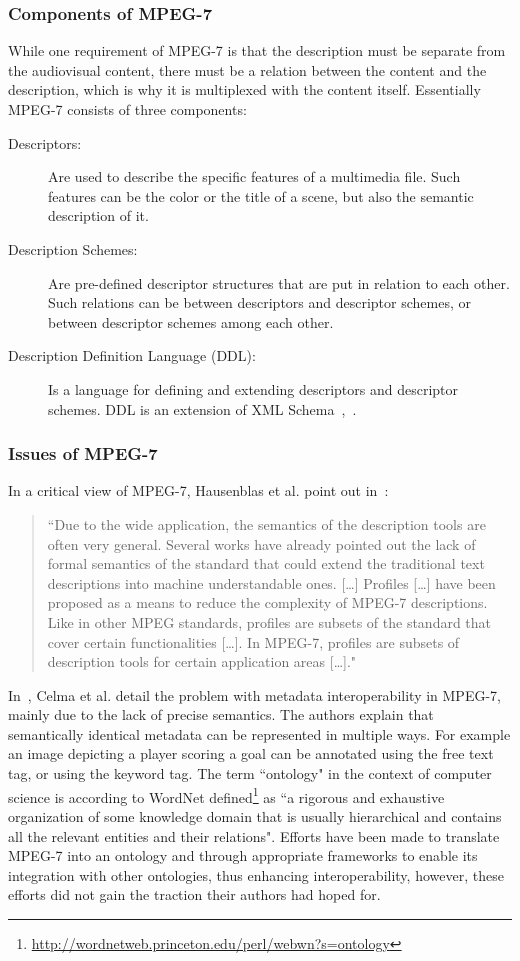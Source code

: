 \documentclass[12pt]{article}
\begin{document}
\subsubsection{Components of MPEG-7}
While one requirement of MPEG-7 is that the description must be separate from the audiovisual content, there must be a relation between the content and the description, which is why it is multiplexed with the content itself. Essentially MPEG-7 consists of three components:
\begin{description}
\item [Descriptors:] Are used to describe the specific features of a multimedia file. Such features can be the color or the title of a scene, but also the semantic description of it. 
\item [Description Schemes:] Are pre-defined descriptor structures that are put in relation to each other. Such relations can be between descriptors and descriptor schemes, or between descriptor schemes among each other.
\item [Description Definition Language (DDL):] Is a language for defining and extending descriptors and descriptor schemes. DDL is an extension of XML Schema~\cite{xmlschema1sec},~\cite{xmlschema2sec}.
\end{description}

\subsubsection{Issues of MPEG-7}
In a critical view of MPEG-7, Hausenblas et al. point out in~\cite{Hau07}:

\begin{quotation}
\noindent ``Due to the wide application, the semantics of the description tools are often very general. Several works have already pointed out the lack of formal semantics of the standard that could extend the traditional text descriptions into machine understandable ones. [\ldots] Profiles [\ldots] have been proposed as a means to reduce the complexity of MPEG-7 descriptions. Like in other MPEG standards, profiles are subsets of the standard that cover certain functionalities [\ldots]. In MPEG-7, profiles are subsets of description tools for certain application areas [\ldots]."
\end{quotation}

\noindent In~\cite{Celma2007}, Celma et al. detail the problem with metadata interoperability in MPEG-7, mainly due to the lack of precise semantics. The authors explain that semantically identical metadata can be represented in multiple ways. For example an image depicting a player scoring a goal can be annotated using the free text tag, or using the keyword tag. The term ``ontology" in the context of computer science is according to WordNet defined\footnote{\url{http://wordnetweb.princeton.edu/perl/webwn?s=ontology}} as ``a rigorous and exhaustive organization of some knowledge domain that is usually hierarchical and contains all the relevant entities and their relations". Efforts have been made to translate MPEG-7 into an ontology and through appropriate frameworks to enable its integration with other ontologies, thus enhancing interoperability, however, these efforts did not gain the traction their authors had hoped for.
\end{document}

